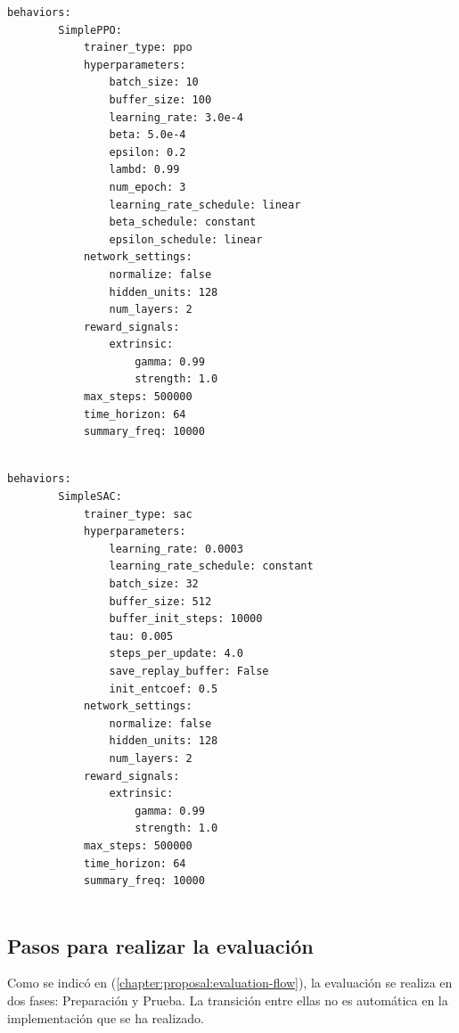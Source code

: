\begin{lstlisting}[caption={Configuración de hiperparámetros para el agente con el algoritmo PPO}]
    behaviors:
        SimplePPO:
            trainer_type: ppo
            hyperparameters:
                batch_size: 10
                buffer_size: 100
                learning_rate: 3.0e-4
                beta: 5.0e-4
                epsilon: 0.2
                lambd: 0.99
                num_epoch: 3
                learning_rate_schedule: linear
                beta_schedule: constant
                epsilon_schedule: linear
            network_settings:
                normalize: false
                hidden_units: 128
                num_layers: 2
            reward_signals:
                extrinsic:
                    gamma: 0.99
                    strength: 1.0
            max_steps: 500000
            time_horizon: 64
            summary_freq: 10000
 
\end{lstlisting}
 
\vspace*{1cm}
 
\begin{lstlisting}[caption={Configuración de hiperparámetros para el agente con el algoritmo SAC}]
    behaviors:
        SimpleSAC:
            trainer_type: sac
            hyperparameters:
                learning_rate: 0.0003
                learning_rate_schedule: constant
                batch_size: 32
                buffer_size: 512
                buffer_init_steps: 10000
                tau: 0.005
                steps_per_update: 4.0
                save_replay_buffer: False
                init_entcoef: 0.5
            network_settings:
                normalize: false
                hidden_units: 128
                num_layers: 2
            reward_signals:
                extrinsic:
                    gamma: 0.99
                    strength: 1.0
            max_steps: 500000
            time_horizon: 64
            summary_freq: 10000
 
\end{lstlisting}
 
\subsection{Pasos para realizar la evaluación}
 
Como se indicó en (\ref{chapter:proposal:evaluation-flow}), la evaluación se realiza en dos fases: Preparación y Prueba. La transición entre ellas no es automática en la implementación que se ha realizado. 
 
